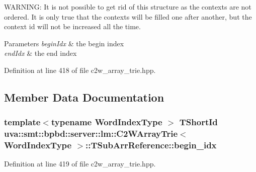 W\+A\+R\+N\+I\+N\+G\+: It is not possible to get rid of this structure as the contexts are not ordered. It is only true that the contexts will be filled one after another, but the context id will not be increased all the time.


\begin{DoxyParams}{Parameters}
{\em begin\+Idx} & the begin index \\
\hline
{\em end\+Idx} & the end index \\
\hline
\end{DoxyParams}


Definition at line 418 of file c2w\+\_\+array\+\_\+trie.\+hpp.



\subsection{Member Data Documentation}
\hypertarget{structuva_1_1smt_1_1bpbd_1_1server_1_1lm_1_1_c2_w_array_trie_1_1_t_sub_arr_reference_a256f6783e54013b0ebb38c1faf006d53}{}
\subsubsection[{begin\+\_\+idx}]{\setlength{\rightskip}{0pt plus 5cm}template$<$typename Word\+Index\+Type $>$ {\bf T\+Short\+Id} {\bf uva\+::smt\+::bpbd\+::server\+::lm\+::\+C2\+W\+Array\+Trie}$<$ {\bf Word\+Index\+Type} $>$\+::T\+Sub\+Arr\+Reference\+::begin\+\_\+idx}\label{structuva_1_1smt_1_1bpbd_1_1server_1_1lm_1_1_c2_w_array_trie_1_1_t_sub_arr_reference_a256f6783e54013b0ebb38c1faf006d53}


Definition at line 419 of file c2w\+\_\+array\+\_\+trie.\+hpp.

\hypertarget{structuva_1_1smt_1_1bpbd_1_1server_1_1lm_1_1_c2_w_array_trie_1_1_t_sub_arr_reference_ad05a303eb8f2a85b958a2f7b775d534a}{}
